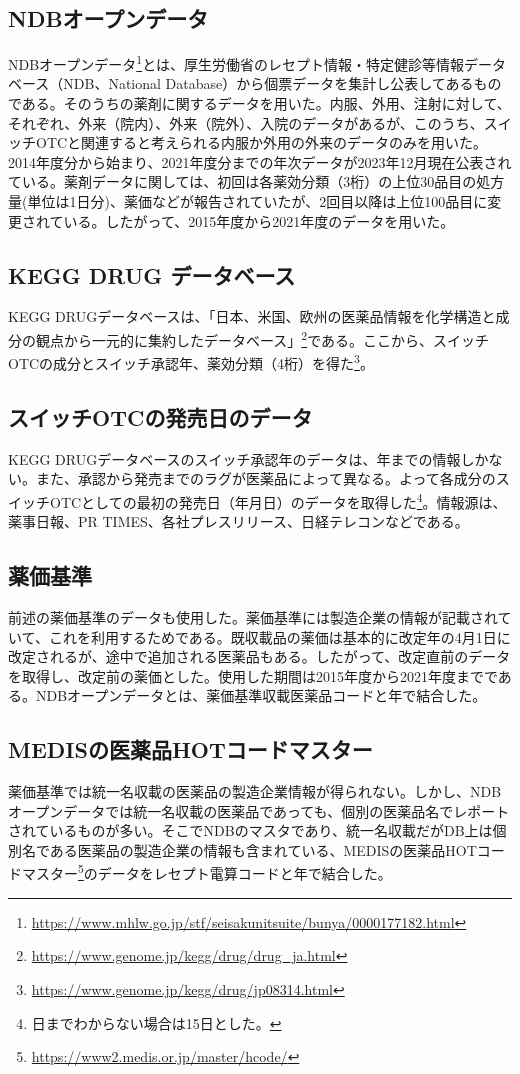 \documentclass[a4paper,12pt,uplatex]{jsarticle}
\theoremstyle{definition}
\begin{document}
\subsection{NDBオープンデータ}
NDBオープンデータ\footnote{\url{https://www.mhlw.go.jp/stf/seisakunitsuite/bunya/0000177182.html}}とは、厚生労働省のレセプト情報・特定健診等情報データベース（NDB、National Database）から個票データを集計し公表してあるものである。そのうちの薬剤に関するデータを用いた。内服、外用、注射に対して、それぞれ、外来（院内）、外来（院外）、入院のデータがあるが、このうち、スイッチOTCと関連すると考えられる内服か外用の外来のデータのみを用いた。2014年度分から始まり、2021年度分までの年次データが2023年12月現在公表されている。薬剤データに関しては、初回は各薬効分類（3桁）の上位30品目の処方量(単位は1日分)、薬価などが報告されていたが、2回目以降は上位100品目に変更されている。したがって、2015年度から2021年度のデータを用いた。 
\subsection{KEGG DRUG データベース}
KEGG DRUGデータベースは、「日本、米国、欧州の医薬品情報を化学構造と成分の観点から一元的に集約したデータベース」\footnote{\url{https://www.genome.jp/kegg/drug/drug_ja.html}}である。ここから、スイッチOTCの成分とスイッチ承認年、薬効分類（4桁）を得た\footnote{\url{https://www.genome.jp/kegg/drug/jp08314.html}}。
\subsection{スイッチOTCの発売日のデータ}
KEGG DRUGデータベースのスイッチ承認年のデータは、年までの情報しかない。また、承認から発売までのラグが医薬品によって異なる。よって各成分のスイッチOTCとしての最初の発売日（年月日）のデータを取得した\footnote{日までわからない場合は15日とした。}。情報源は、薬事日報、PR TIMES、各社プレスリリース、日経テレコンなどである。
\subsection{薬価基準}
前述の薬価基準のデータも使用した。薬価基準には製造企業の情報が記載されていて、これを利用するためである。既収載品の薬価は基本的に改定年の4月1日に改定されるが、途中で追加される医薬品もある。したがって、改定直前のデータを取得し、改定前の薬価とした。使用した期間は2015年度から2021年度までである。NDBオープンデータとは、薬価基準収載医薬品コードと年で結合した。
\subsection{MEDISの医薬品HOTコードマスター}
薬価基準では統一名収載の医薬品の製造企業情報が得られない。しかし、NDBオープンデータでは統一名収載の医薬品であっても、個別の医薬品名でレポートされているものが多い。そこでNDBのマスタであり、統一名収載だがDB上は個別名である医薬品の製造企業の情報も含まれている、MEDISの医薬品HOTコードマスター\footnote{\url{https://www2.medis.or.jp/master/hcode/}}のデータをレセプト電算コードと年で結合した。
\end{document}
